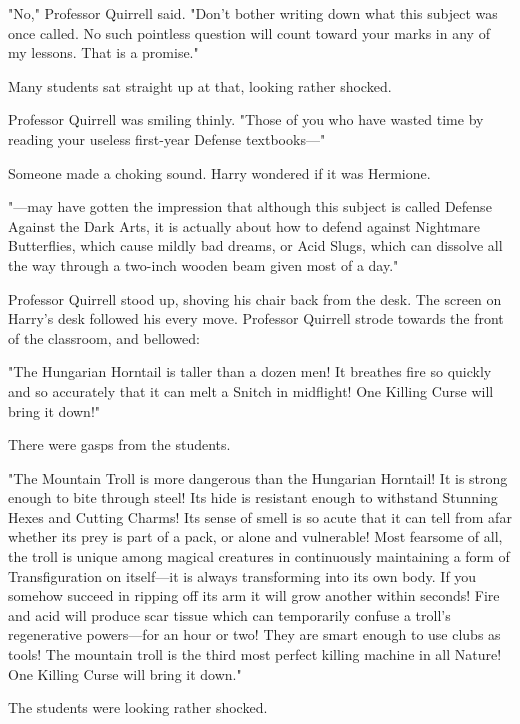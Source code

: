 "No," Professor Quirrell said. "Don't bother writing down what this subject was
once called. No such pointless question will count toward your marks in any of
my lessons. That is a promise."

Many students sat straight up at that, looking rather shocked.

Professor Quirrell was smiling thinly. "Those of you who have wasted time by
reading your useless first-year Defense textbooks---"

Someone made a choking sound. Harry wondered if it was Hermione.

"---may have gotten the impression that although this subject is called Defense
Against the Dark Arts, it is actually about how to defend against Nightmare
Butterflies, which cause mildly bad dreams, or Acid Slugs, which can dissolve
all the way through a two-inch wooden beam given most of a day."

Professor Quirrell stood up, shoving his chair back from the desk. The screen
on Harry's desk followed his every move. Professor Quirrell strode towards the
front of the classroom, and bellowed:

"The Hungarian Horntail is taller than a dozen men! It breathes fire so quickly
and so accurately that it can melt a Snitch in midflight! One Killing Curse
will bring it down!"

There were gasps from the students.

"The Mountain Troll is more dangerous than the Hungarian Horntail! It is strong
enough to bite through steel! Its hide is resistant enough to withstand
Stunning Hexes and Cutting Charms! Its sense of smell is so acute that it can
tell from afar whether its prey is part of a pack, or alone and vulnerable!
Most fearsome of all, the troll is unique among magical creatures in
continuously maintaining a form of Transfiguration on itself---it is always
transforming into its own body. If you somehow succeed in ripping off its arm
it will grow another within seconds! Fire and acid will produce scar tissue
which can temporarily confuse a troll's regenerative powers---for an hour or
two! They are smart enough to use clubs as tools! The mountain troll is the
third most perfect killing machine in all Nature! One Killing Curse will bring
it down."

The students were looking rather shocked.

